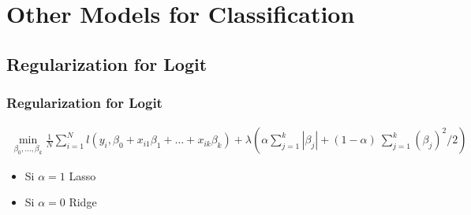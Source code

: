 \documentclass[
  shownotes,
  xcolor={svgnames},
  hyperref={colorlinks,citecolor=DarkBlue,linkcolor=andesred,urlcolor=DarkBlue}
  , aspectratio=169]{beamer}
\begin{document}
\section{Other Models for Classification}
\subsection{Regularization for Logit}
\begin{frame}[fragile]
\frametitle{Regularization for Logit}

\begin{align}
\min_{\beta_0,\dots,\beta_k} \frac{1}{N} \sum_{i=1}^{N} l(y_i,\beta_0 + x_{i1}\beta_1 + \dots + x_{ik}\beta_k) + \lambda\left( \alpha \sum_{j=1}^k |\beta_j| + (1-\alpha)\ \sum_{j=1}^k (\beta_j)^2/2 \right)
\end{align}

\begin{itemize}
 \item Si $\alpha=1$ Lasso
 \medskip
 \item Si $\alpha=0$ Ridge 
\end{itemize}

\end{frame}
\end{document}
